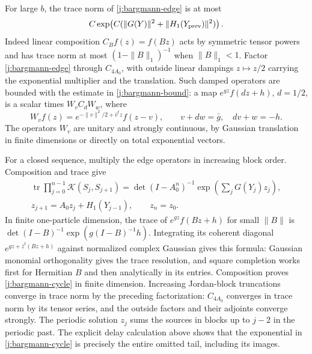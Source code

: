 For large $b$, the trace norm of \eqref{j:bargmann-edge} is at most
\begin{equation}\label{j:bargmann-bound}
 C\exp\!\left(C(\|G(Y)\|^2+\|H_1(Y_{\rm prev})\|^2)\right).
\end{equation}
Indeed linear composition $C_Bf(z)=f(Bz)$ acts by symmetric tensor
powers and has trace norm at most $(1-\|B\|_1)^{-1}$ when $\|B\|_1<1$.
Factor \eqref{j:bargmann-edge} through $C_{4A_0}$, with outside linear
dampings $z\mapsto z/2$ carrying the exponential multiplier and the
translation. Such damped operators are bounded with the estimate in
\eqref{j:bargmann-bound}: a map $e^{gz}f(dz+h)$, $d=1/2$, is a scalar
times $W_vC_dW_w$, where
\[
 W_vf(z)=e^{-\|v\|^2/2+\bar v^tz}f(z-v),
 \qquad v+dw=\bar g,\quad dv+w=-h.
\]
The operators $W_v$ are unitary and strongly continuous, by Gaussian
translation in finite dimensions or directly on total exponential
vectors.

For a closed sequence, multiply the edge operators in increasing block
order. Composition and trace give
\begin{equation}\label{j:bargmann-cycle}
 \begin{gathered}
 \operatorname{tr}\prod_{j=0}^{n-1}\mathcal K(S_j,S_{j+1})
 =\det(I-A_0^n)^{-1}\exp\!\left(\sum_jG(Y_j)z_j\right),\\
 z_{j+1}=A_0z_j+H_1(Y_{j-1}),\qquad z_n=z_0.
 \end{gathered}
\end{equation}
In finite one-particle dimension, the trace of $e^{gz}f(Bz+h)$ for
small $\|B\|$ is
$\det(I-B)^{-1}\exp(g(I-B)^{-1}h)$. Integrating its coherent diagonal
$e^{gz+\bar z^t(Bz+h)}$ against normalized complex Gaussian gives this
formula: Gaussian monomial orthogonality gives the trace resolution, and
square completion works first for Hermitian $B$ and then analytically in
its entries. Composition proves \eqref{j:bargmann-cycle} in finite
dimension. Increasing Jordan-block truncations converge in trace norm by
the preceding factorization: $C_{4A_0}$ converges in trace norm by its
tensor series, and the outside factors and their adjoints converge
strongly. The periodic solution $z_j$ sums the sources in blocks up to
$j-2$ in the periodic past. The explicit delay calculation above shows
that the exponential in \eqref{j:bargmann-cycle} is precisely the entire
omitted tail, including its images.

